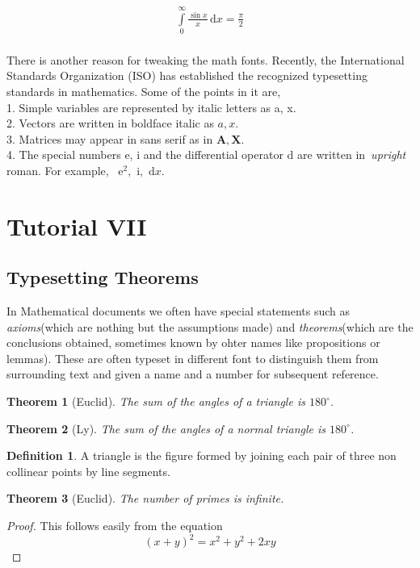 \documentclass{article}
\newtheorem{thm}{Theorem}[section]
\theoremstyle{definition}
\newtheorem{dfn}{Definition}
\theoremstyle{remark}
\theoremstyle{plain}
\numberwithin{equation}{subsection}
\begin{document}
{\begin{align*}
\int\limits_0^\infty\frac{\sin x}{x}\,\mathrm{d}x=\frac{\pi}{2}
\end{align*}\\
There is another reason for tweaking the math fonts. Recently, the International
Standards Organization (ISO) has established the recognized typesetting standards in
mathematics. Some of the points in it are,\\
1. Simple variables are represented by italic letters as a, x.\\
2. Vectors are written in boldface italic as $a, x$.\\
3. Matrices may appear in sans serif as in $\mathbf{A,X}$.\\
4. The special numbers e, i and the differential operator d are written in\ \textit{upright } roman. For example, \
\newcommand{\me}{\mathrm{e}}$\me^2,$
\newcommand{\mi}{\mathrm{i}}$\mi,$
\newcommand{\diff}{\mathrm{d}}$\diff x$.

\newpage
\section{Tutorial VII}
\subsection{Typesetting Theorems}
In Mathematical documents we often have special statements such as \textit{axioms}(which are nothing but the assumptions made) and \textit{theorems}(which are the conclusions obtained, sometimes known by ohter names like propositions or lemmas). These are often typeset in different font to distinguish them from surrounding text and given a name and a number for subsequent reference.
\begin{thm}[Euclid]
	The sum of the angles of a triangle is $180^\circ$.
\end{thm}
\begin{thm}[Ly]
	The sum of the angles of a normal triangle is $180^\circ$.
\end{thm}
\begin{dfn}
	A triangle is the figure formed by joining each pair
	of three non collinear points by line segments.
\end{dfn}
\begin{thm}[Euclid]
	The number of primes is infinite.
\end{thm}
\begin{proof}
	This follows easily from the equation
	\begin{equation}
	(x+y)^2=x^2+y^2+2xy\tag*{\qed}
	\end{equation}
	\renewcommand{\qed}{}
\end{proof}

}
\end{document}
